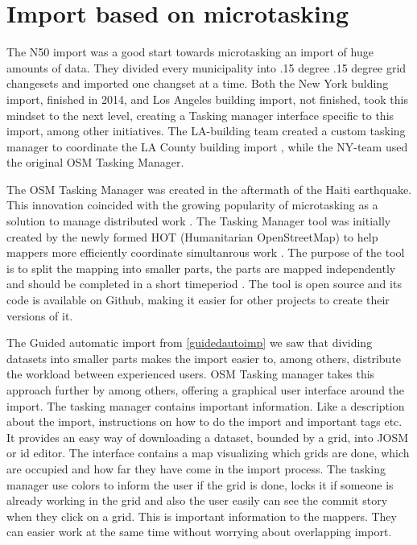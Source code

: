 \section{Import based on microtasking}\label{sec:importmicro}
The N50 import was a good start towards microtasking an import of huge amounts of data. They divided every municipality into .15 degree .15 degree grid changesets and imported one changset at a time. Both the New York bulding import, finished in 2014, and Los Angeles building import, not finished, took this mindset to the next level, creating a Tasking manager interface specific to this import, among other initiatives. The LA-building team created a custom tasking manager to coordinate the LA County building import \cite{OSMTaskingManager}, while the NY-team used the original OSM Tasking Manager. 

The OSM Tasking Manager was created in the aftermath of the Haiti earthquake. This innovation coincided with the growing popularity of microtasking as a solution to manage distributed work \cite{Palen2015}. The Tasking Manager tool was initially created by the newly formed HOT (Humanitarian OpenStreetMap) to help mappers more efficiently coordinate simultanrous work \cite{Palen2015}. The purpose of the tool is to split the mapping into smaller parts, the parts are mapped independently and should be completed in a short timeperiod \cite{HOTa}. The tool is open source and its code is available on Github, making it easier for other projects to create their versions of it. %

The Guided automatic import from \ref{guidedautoimp} we saw that dividing datasets into smaller parts makes the import easier to, among others, distribute the workload between experienced users. OSM Tasking manager takes this approach further by among others, offering a graphical user interface around the import. The tasking manager contains important information. Like a description about the import, instructions on how to do the import and important tags etc. It provides an easy way of downloading a dataset, bounded by a grid, into JOSM or id editor. The interface contains a map visualizing which grids are done, which are occupied and how far they have come in the import process. The tasking manager use colors to inform the user if the grid is done, locks it if someone is already working in the grid and also the user easily can see the commit story when they click on a grid. This is important information to the mappers. They can easier work at the same time without worrying about overlapping import. 

